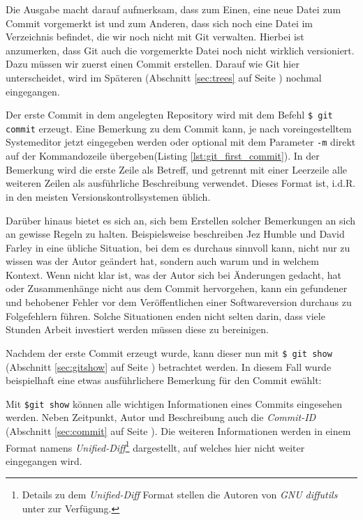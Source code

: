Die Ausgabe macht darauf aufmerksam, dass zum Einen, eine neue Datei zum Commit
vorgemerkt ist und zum Anderen, dass sich noch eine Datei im Verzeichnis
befindet, die wir noch nicht mit Git verwalten. Hierbei ist anzumerken, dass
Git auch die vorgemerkte Datei noch nicht wirklich versioniert. Dazu müssen wir
zuerst einen Commit erstellen. Darauf wie Git hier unterscheidet, wird im
Späteren (Abschnitt \ref{sec:trees} auf Seite \pageref{sec:trees}) nochmal
eingegangen.

Der erste Commit in dem angelegten Repository wird mit dem Befehl \texttt{\$
git commit} erzeugt. Eine Bemerkung zu dem Commit kann, je nach
voreingestelltem Systemeditor jetzt eingegeben werden oder optional mit dem
Parameter \texttt{-m} direkt auf der Kommandozeile übergeben(Listing
\ref{lst:git_first_commit}). In der Bemerkung wird die erste Zeile als Betreff,
und getrennt mit einer Leerzeile alle weiteren Zeilen als ausführliche
Beschreibung verwendet. Dieses Format ist, i.d.R. in den meisten
Versionskontrollsystemen üblich.



Darüber hinaus bietet es sich an, sich bem Erstellen solcher Bemerkungen an sich
an gewisse Regeln zu halten. Beispielsweise beschreiben Jez Humble und David
Farley in \cite[S.~37]{cd} eine übliche Situation, bei dem es durchaus sinnvoll
kann, nicht nur zu wissen was der Autor geändert hat, sondern auch warum
und in welchem Kontext. Wenn nicht klar ist, was der Autor sich bei
Änderungen gedacht, hat oder Zusammenhänge nicht aus dem Commit hervorgehen, kann
ein gefundener und behobener Fehler vor dem Veröffentlichen einer
Softwareversion durchaus zu Folgefehlern führen. Solche Situationen enden
nicht selten darin, dass viele Stunden Arbeit investiert werden müssen diese zu
bereinigen.\cite[S.~37]{cd}

Nachdem der erste Commit erzeugt wurde, kann dieser nun mit \texttt{\$ git
show} (Abschnitt \ref{sec:gitshow} auf Seite \pageref{sec:git_show}) betrachtet
werden. In diesem Fall wurde beispielhaft eine etwas ausführlichere Bemerkung
für den Commit ewählt:



Mit \texttt{\$git show} können alle wichtigen Informationen eines Commits
eingesehen werden.  Neben Zeitpunkt, Autor und Beschreibung auch die
\textit{Commit-ID} (Abschnitt \ref{sec:commit} auf Seite \pageref{sec:commit}).
Die weiteren Informationen werden in einem Format namens
\textit{Unified-Diff}\footnote{Details zu dem \textit{Unified-Diff} Format
stellen die Autoren von \textit{GNU diffutils} unter
\cite[S.~12-13]{paper:diffutils} zur Verfügung.} dargestellt, auf welches hier
nicht weiter eingegangen wird.\cite[25]{gitops}

